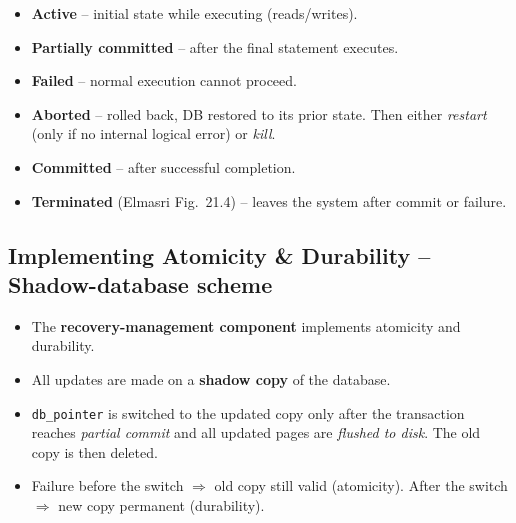 \documentclass[10pt,a4paper]{article}
\newcommand{\op}[1]{\texttt{#1}}
\begin{document}
\begin{minipage}{0.52\linewidth}
\begin{itemize}
  \item \textbf{Active} -- initial state while executing (reads/writes).
  \item \textbf{Partially committed} -- after the final statement executes.
  \item \textbf{Failed} -- normal execution cannot proceed.
  \item \textbf{Aborted} -- rolled back, DB restored to its prior state. Then either \emph{restart} (only if no internal logical error) or \emph{kill}.
  \item \textbf{Committed} -- after successful completion.
  \item \textbf{Terminated} (Elmasri Fig.~21.4) -- leaves the system after commit or failure.
\end{itemize}
\end{minipage}\hfill
\begin{minipage}{0.46\linewidth}
\centering
{}
\end{minipage}

\subsection*{Implementing Atomicity \& Durability -- Shadow-database scheme}
\begin{itemize}
  \item The \textbf{recovery-management component} implements atomicity and durability.
  \item All updates are made on a \textbf{shadow copy} of the database.
  \item \op{db\_pointer} is switched to the updated copy only after the transaction reaches \emph{partial commit} and all updated pages are \emph{flushed to disk}. The old copy is then deleted.
  \item Failure before the switch $\Rightarrow$ old copy still valid (atomicity). After the switch $\Rightarrow$ new copy permanent (durability).
\end{itemize}
\end{document}
